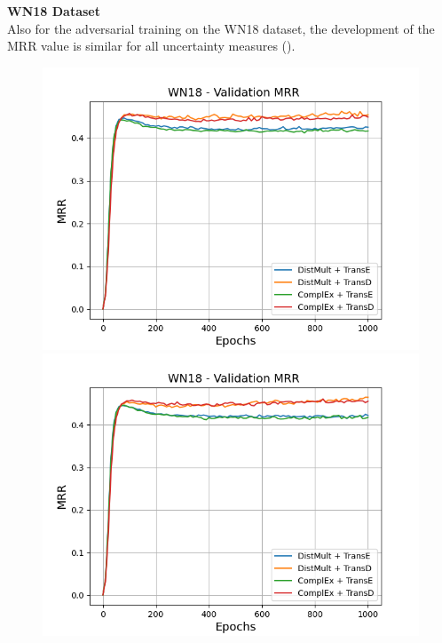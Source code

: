 \textbf{WN18 Dataset}
\label{subsubsec:measures_wn18}\\
%
Also for the adversarial training on the WN18 dataset, the development of the MRR value is similar for all uncertainty measures ().
\begin{figure}[H]
    \centering
    \begin{minipage}{.5\textwidth}
      \centering
      \includegraphics[width=0.9\linewidth]{figures/results/gan_train/not_pretrained/uncertainty/max_distribution/entropy/wn18/1k_epochs/uncertainty_wn18_mrrs.png}
    \end{minipage}%
    \begin{minipage}{.5\textwidth}
      \centering
      \includegraphics[width=0.9\linewidth]{figures/results/gan_train/not_pretrained/uncertainty/max_distribution/least_confidence/wn18/uncertainty_wn18_mrrs.png}

\end{minipage}
\end{figure}
